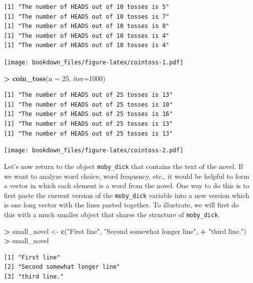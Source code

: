 \documentclass[]{krantz}
\makeatletter
\newenvironment{Shaded}{\begin{snugshade}}{\end{snugshade}}
\newcommand{\KeywordTok}[1]{\textcolor[rgb]{0.27,0.27,0.27}{\textbf{#1}}}
\newcommand{\DataTypeTok}[1]{\textcolor[rgb]{0.27,0.27,0.27}{#1}}
\newcommand{\DecValTok}[1]{\textcolor[rgb]{0.06,0.06,0.06}{#1}}
\newcommand{\StringTok}[1]{\textcolor[rgb]{0.5,0.5,0.5}{#1}}
\newcommand{\OperatorTok}[1]{\textcolor[rgb]{0.43,0.43,0.43}{\textbf{#1}}}
\newcommand{\NormalTok}[1]{#1}
\newenvironment{kframe}{%
\medskip{}
\setlength{\fboxsep}{.8em}
 \def\at@end@of@kframe{}%
 \ifinner\ifhmode%
  \def\at@end@of@kframe{\end{minipage}}%
  \begin{minipage}{\columnwidth}%
 \fi\fi%
 \def\FrameCommand##1{\hskip\@totalleftmargin \hskip-\fboxsep
 \colorbox{shadecolor}{##1}\hskip-\fboxsep
     \hskip-\linewidth \hskip-\@totalleftmargin \hskip\columnwidth}%
 \MakeFramed {\advance\hsize-\width
   \@totalleftmargin\z@ \linewidth\hsize
   \@setminipage}}%
 {\par\unskip\endMakeFramed%
 \at@end@of@kframe}
\renewenvironment{Shaded}{\begin{kframe}}{\end{kframe}}
\makeatother
\begin{document}
\begin{verbatim}
[1] "The number of HEADS out of 10 tosses is 5"
[1] "The number of HEADS out of 10 tosses is 7"
[1] "The number of HEADS out of 10 tosses is 8"
[1] "The number of HEADS out of 10 tosses is 4"
[1] "The number of HEADS out of 10 tosses is 4"
\end{verbatim}

\texttt{[image: bookdown\_files/figure-latex/cointoss-1.pdf]}

\begin{Shaded}
\begin{Highlighting}[]
\OperatorTok{>}\StringTok{ }\KeywordTok{coin_toss}\NormalTok{(}\DataTypeTok{n =} \DecValTok{25}\NormalTok{, }\DataTypeTok{iter=}\DecValTok{1000}\NormalTok{)}
\end{Highlighting}
\end{Shaded}

\begin{verbatim}
[1] "The number of HEADS out of 25 tosses is 13"
[1] "The number of HEADS out of 25 tosses is 10"
[1] "The number of HEADS out of 25 tosses is 16"
[1] "The number of HEADS out of 25 tosses is 13"
[1] "The number of HEADS out of 25 tosses is 13"
\end{verbatim}

\texttt{[image: bookdown\_files/figure-latex/cointoss-2.pdf]}

Let's now return to the object \texttt{moby\_dick} that contains the
text of the novel. If we want to analyze word choice, word frequency,
etc., it would be helpful to form a vector in which each element is a
word from the novel. One way to do this is to first paste the current
version of the \texttt{moby\_dick} variable into a new version which is
one long vector with the lines pasted together. To illustrate, we will
first do this with a much smaller object that shares the structure of
\texttt{moby\_dick}.

\begin{Shaded}
\begin{Highlighting}[]
\OperatorTok{>}\StringTok{ }\NormalTok{small_novel <-}\StringTok{ }\KeywordTok{c}\NormalTok{(}\StringTok{"First line"}\NormalTok{, }\StringTok{"Second somewhat longer line"}\NormalTok{, }
\OperatorTok{+}\StringTok{                  "third line."}\NormalTok{)}
\OperatorTok{>}\StringTok{ }\NormalTok{small_novel}
\end{Highlighting}
\end{Shaded}

\begin{verbatim}
[1] "First line"                 
[2] "Second somewhat longer line"
[3] "third line."                
\end{verbatim}
\end{document}
